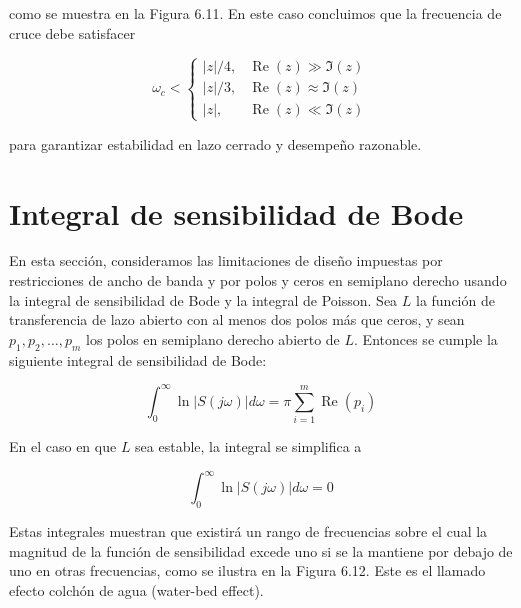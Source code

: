 

como se muestra en la Figura 6.11. En este caso concluimos que la frecuencia de cruce debe satisfacer

\[
\omega_{c}< \begin{cases}|z| / 4, & \operatorname{Re}(z) \gg \Im(z)  \tag{6.14}\\ |z| / 3, & \operatorname{Re}(z) \approx \Im(z) \\ |z|, & \operatorname{Re}(z) \ll \Im(z)\end{cases}
\]

para garantizar estabilidad en lazo cerrado y desempeño razonable.

\section{Integral de sensibilidad de Bode}
En esta sección, consideramos las limitaciones de diseño impuestas por restricciones de ancho de banda y por polos y ceros en semiplano derecho usando la integral de sensibilidad de Bode y la integral de Poisson. Sea $L$ la función de transferencia de lazo abierto con al menos dos polos más que ceros, y sean $p_{1}, p_{2}, \ldots, p_{m}$ los polos en semiplano derecho abierto de $L$. Entonces se cumple la siguiente integral de sensibilidad de Bode:


\begin{equation*}
\int_{0}^{\infty} \ln |S(j \omega)| d \omega=\pi \sum_{i=1}^{m} \operatorname{Re}\left(p_{i}\right) \tag{6.15}
\end{equation*}


En el caso en que $L$ sea estable, la integral se simplifica a


\begin{equation*}
\int_{0}^{\infty} \ln |S(j \omega)| d \omega=0 \tag{6.16}
\end{equation*}


Estas integrales muestran que existirá un rango de frecuencias sobre el cual la magnitud de la función de sensibilidad excede uno si se la mantiene por debajo de uno en otras frecuencias, como se ilustra en la Figura 6.12. Este es el llamado efecto colchón de agua (water-bed effect).

